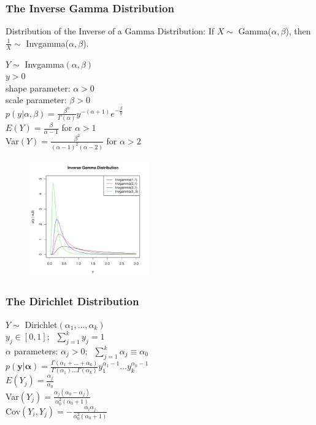 \documentclass{beamer}
\begin{document}
\begin{frame}
\frametitle{The Inverse Gamma Distribution}
\pause
Distribution of the Inverse of a Gamma Distribution: \pause If $X \sim$
Gamma($\alpha, \beta$), then $\frac{1}{X} \sim$ Invgamma($\alpha, \beta$).
\begin{multicols}{2}
\pause
$Y \sim$ Invgamma$(\alpha, \beta)$\\
\bigskip
\pause
$y > 0$\\
\bigskip
\pause
shape parameter: $\alpha > 0$\\
\pause
scale parameter: $\beta > 0$\\
\bigskip
\pause
$p(y|\alpha, \beta) = \frac{\beta^\alpha}{\Gamma(\alpha)}
y^{-(\alpha+1)} e^{-\frac{\beta}{y}}$\\
\bigskip
\bigskip
\pause
$E(Y) = \frac{\beta}{\alpha-1}$ for $\alpha > 1$\\
\bigskip
\pause
Var$(Y) = \frac{\beta^2}{(\alpha-1)^2 (\alpha-2)}$ for $\alpha > 2$
\pause


\begin{figure}[!htp]
\begin{center}
\includegraphics[width=2in, height=2in]{probability-invgamma.pdf}
\end{center}
\end{figure}
\end{multicols}
\end{frame}


\begin{frame}
\frametitle{The Dirichlet Distribution}
\pause
$Y \sim$ Dirichlet$(\alpha_1,\dots, \alpha_k)$\\
\bigskip
\pause
$y_j \in [0,1]; \; \; \sum_{j=1}^{k} y_j = 1$\\
\bigskip
\pause
$\alpha$ parameters: $\alpha_j > 0; \; \; \sum_{j=1}^k \alpha_j \equiv
\alpha_0$\\
\bigskip
\pause
$p(\mathbf{y}| \bm{\alpha}) = \frac{\Gamma (\alpha_1 + \dots +
\alpha_k)}{\Gamma (\alpha_1) \dots \Gamma (\alpha_k)} y_1^{\alpha_1 -
1} \dots y_k^{\alpha_k - 1}$\\
\bigskip
\bigskip
\pause
$E(Y_j) = \frac{\alpha_j}{\alpha_0}$\\
\bigskip
\pause
Var$(Y_j) = \frac{\alpha_j (\alpha_0 - \alpha_j)}{\alpha^2_0 (\alpha_0
+ 1)}$\\
\bigskip
\pause
Cov$(Y_i, Y_j) = -\frac{\alpha_i \alpha_j}{\alpha^2_0 (\alpha_0 + 1)}$
\end{frame}
\end{document}
